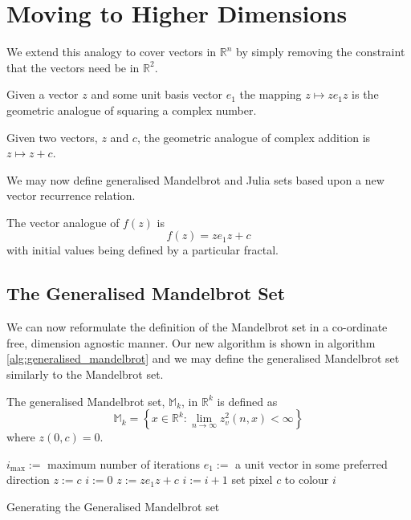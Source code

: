 \section{Moving to Higher Dimensions}

We extend this analogy to cover vectors in $\mathbb{R}^n$ 
by simply removing the constraint that the vectors need be in $\mathbb{R}^2$.

\begin{definition}
Given a vector $z$ and some unit basis vector $e_1$ the mapping
$z \mapsto ze_1z$ is the geometric analogue of squaring a complex number.
\end{definition}

\begin{definition}
Given two vectors, $z$ and $c$, the geometric analogue of complex addition
is $z \mapsto z + c$.
\end{definition}

We may now define generalised Mandelbrot and Julia sets based upon
a new vector recurrence relation.

\begin{definition}\label{def:gen_f(z)}
The vector analogue of $f(z)$ is 
\[
f(z) = ze_1z + c
\]
with initial values being defined by a particular fractal.
\end{definition}

\subsection{The Generalised Mandelbrot Set}

We can now reformulate the definition of the Mandelbrot set in a co-ordinate
free, dimension agnostic manner. Our new algorithm is shown in algorithm
\ref{alg:generalised_mandelbrot} and we may define the generalised
Mandelbrot set similarly to the Mandelbrot set.

\begin{definition}
The generalised Mandelbrot set, $\mathbb{M}_k$, in $\mathbb{R}^k$ 
    is defined as
\[
\mathbb{M}_k = 
\left\{x \in \mathbb{R}^k 
: \lim_{n \rightarrow \infty} z_v^2(n,x) < \infty \right\} 
\]
where $z(0,c) = 0$.
\end{definition}

\begin{fancyalg}
\begin{algorithmic}[1]
\STATE $i_{\mbox{max}} :=$ maximum number of iterations
\STATE $e_1 :=$ a unit vector in some preferred direction
\STATE $z := c$
\STATE $i := 0$
  \STATE $z := ze_1z + c$
  \STATE $i := i+1$
\ENDWHILE 
\STATE set pixel $c$ to colour $i$
\ENDFOR
\end{algorithmic}
\caption{
\label{alg:generalised_mandelbrot}
  Generating the Generalised Mandelbrot set}
\end{fancyalg}

